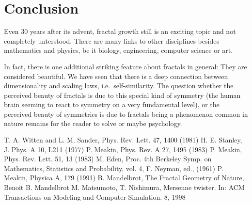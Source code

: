 \documentclass[twocolumn,10pt]{scrartcl}
\begin{document}
    \section{Conclusion}
        Even 30 years after its advent, fractal growth still is an exciting topic and not completely unterstood.
        There are many links to other disciplines besides mathematics and physics, be it biology, engineering,
        computer science or art.

        In fact, there is one additional striking feature about fractals in general: They are considered beautiful. We
        have seen that there is a deep connection between dimensionality and scaling laws, i.e.\ self-similarity. The
        question whether the perceived beauty of fractals is due to this special kind of symmetry (the human brain
        seeming to react to symmetry on a very fundamental level), or the perceived beauty of symmetries is due to
        fractals being a phenomenon common in nature remains for the reader to solve or maybe psychology.

    \begin{thebibliography}{99}
         T. A. Witten and L. M. Sander, Phys. Rev. Lett. 47, 1400 (1981)
         H. E. Stanley, J. Phys. A 10, L211 (1977)
         P. Meakin, Phys. Rev. A 27, 1495 (1983)
         P. Meakin, Phys. Rev. Lett. 51, 13 (1983)
         M. Eden, Proc. 4th Berkeley Symp. on Mathematics, Statistics and Probability, vol. 4,
            F. Neyman, ed., (1961)
         P. Meakin, Physica A, 179 (1991)
         B. Mandelbrot, The Fractal Geometry of Nature, Benoit B. Mandelbrot
        M. Matsumoto, T. Nishimura, Mersenne twister. In: ACM Transactions on Modeling and
          Computer Simulation. 8, 1998
    \end{thebibliography}
\end{document}
